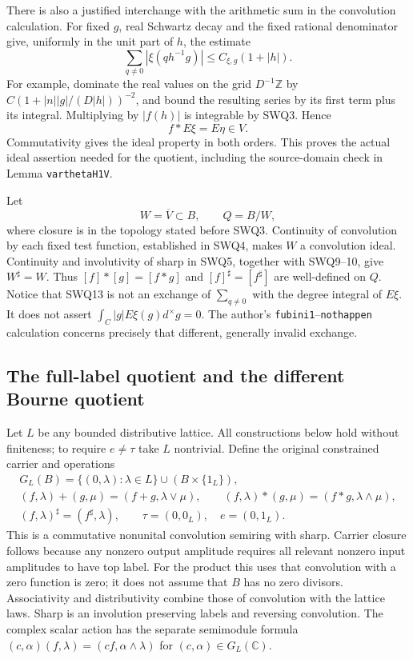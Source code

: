 \documentclass[11pt]{article}
\begin{document}
There is also a justified interchange with the arithmetic sum in
the convolution calculation. For fixed $g$, real Schwartz decay and
the fixed rational denominator give, uniformly in the unit part of
$h$, the estimate
\[
 \sum_{q\ne0}|\xi(qh^{-1}g)|\le C_{\xi,g}(1+|h|).
\]
For example, dominate the real values on the grid $D^{-1}\mathbb Z$
by $C(1+|n||g|/(D|h|))^{-2}$, and bound the resulting series by
its first term plus its integral. Multiplying by $|f(h)|$ is
integrable by SWQ3. Hence
\begin{equation}\tag{SWQ14}
 f*E\xi=E\eta\in V.
\end{equation}
Commutativity gives the ideal property in both orders. This proves
the actual ideal assertion needed for the quotient, including the
source-domain check in Lemma \texttt{varthetaH1V}.

Let
\begin{equation}\tag{SWQ15}
 W=\overline V\subset B,\qquad Q=B/W,
\end{equation}
where closure is in the topology stated before SWQ3. Continuity of
convolution by each fixed test function, established in SWQ4,
makes $W$ a convolution ideal. Continuity and involutivity of
sharp in SWQ5, together with SWQ9--10, give $W^{\sharp}=W$.
Thus
$[f]*[g]=[f*g]$ and $[f]^{\sharp}=[f^{\sharp}]$
are well-defined on $Q$. Notice that SWQ13 is not an exchange of
$\sum_{q\ne0}$ with the degree integral of $E\xi$. It does not
assert $\int_C|g|E\xi(g)d^{\times}g=0$. The author's
\texttt{fubini1}--\texttt{nothappen} calculation concerns precisely
that different, generally invalid exchange.

\subsection{The full-label quotient and the different Bourne quotient}

Let $L$ be any bounded distributive lattice. All constructions below
hold without finiteness; to require $e\ne\tau$ take $L$ nontrivial.
Define the original constrained carrier and operations
\begin{equation}\tag{SWQ16}
\begin{gathered}
 G_L(B)=\{(0,\lambda):\lambda\in L\}\cup(B\times\{1_L\}),\\
 (f,\lambda)+(g,\mu)=(f+g,\lambda\vee\mu),\qquad
 (f,\lambda)*(g,\mu)=(f*g,\lambda\wedge\mu),\\
 (f,\lambda)^{\sharp}=(f^{\sharp},\lambda),\qquad
 \tau=(0,0_L),\quad e=(0,1_L).
\end{gathered}
\end{equation}
This is a commutative nonunital convolution semiring with sharp.
Carrier closure follows because any nonzero output amplitude requires
all relevant nonzero input amplitudes to have top label. For the
product this uses that convolution with a zero function is zero;
it does not assume that $B$ has no zero divisors. Associativity and
distributivity combine those of convolution with the lattice laws.
Sharp is an involution preserving labels and reversing convolution.
The complex scalar action has the separate semimodule formula
$(c,\alpha)(f,\lambda)=(cf,\alpha\wedge\lambda)$ for
$(c,\alpha)\in G_L(\mathbb C)$.
\end{document}
